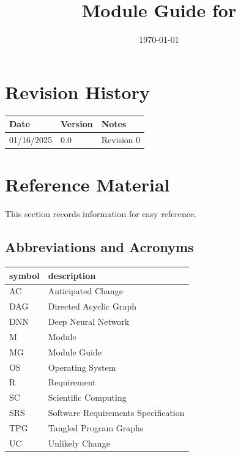 \documentclass[12pt, titlepage]{article}
\begin{document}
\title{Module Guide for \progname{}} 
\author{\authname}
\date{\today}

\maketitle


\section{Revision History}

\begin{tabularx}{\textwidth}{p{3cm}p{2cm}X}
\toprule {\bf Date} & {\bf Version} & {\bf Notes}\\
\midrule
01/16/2025 & 0.0 & Revision 0\\
\bottomrule
\end{tabularx}

\newpage

\section{Reference Material}

This section records information for easy reference.

\subsection{Abbreviations and Acronyms}

\renewcommand{\arraystretch}{1.2}
\begin{tabular}{l l} 
  \toprule		
  \textbf{symbol} & \textbf{description}\\
  \midrule 
  AC & Anticipated Change\\
  DAG & Directed Acyclic Graph \\
  DNN & Deep Neural Network \\
  M & Module \\
  MG & Module Guide \\
  OS & Operating System \\
  R & Requirement\\
  SC & Scientific Computing \\
  SRS & Software Requirements Specification\\
  TPG & Tangled Program Graphs\\
  UC & Unlikely Change \\
  \bottomrule
\end{tabular}\\
\end{document}
